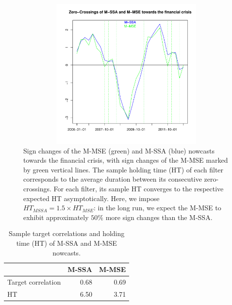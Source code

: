 \documentclass[11pt,a4paper]{article}
\begin{document}
\begin{figure}[H]\begin{center}\includegraphics[height=3in, width=4.5in]{./Figures/mssa_msse_zc.pdf}\caption{Sign changes of the M-MSE (green) and M-SSA (blue) nowcasts towards the financial crisis, with sign changes of the M-MSE marked by green vertical lines. The sample holding time (HT) of each filter corresponds to the average duration between its consecutive zero-crossings. For each filter, its sample HT converges to the respective expected HT asymptotically. Here, we impose  $HT_{MSSA}=1.5\times HT_{MSE}$: in the long run, we expect the M-MSE to exhibit approximately $50\%$ more sign changes than the M-SSA.\label{mssa_msse_zc}}\end{center}\end{figure}
\begin{table}[ht]
\centering
\begin{tabular}{lrr}
  \hline
 & M-SSA & M-MSE \\ 
  \hline
Target correlation & 0.68 & 0.69 \\ 
  HT & 6.50 & 3.71 \\ 
   \hline
\end{tabular}
\caption{Sample target correlations and holding time (HT) of M-SSA and M-MSE nowcasts.} 
\label{corhtnow}
\end{table}
\end{document}
